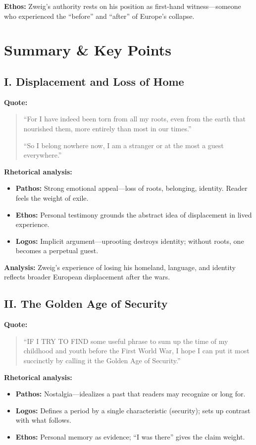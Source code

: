 \documentclass[11pt,a4paper]{article}
\begin{document}
\textbf{Ethos:} Zweig's authority rests on his position as first-hand witness---someone who experienced the ``before'' and ``after'' of Europe's collapse.

\section*{Summary \& Key Points}

\subsection*{I. Displacement and Loss of Home}

\textbf{Quote:}
\begin{quote}
``For I have indeed been torn from all my roots, even from the earth that nourished them, more entirely than most in our times.''

``So I belong nowhere now, I am a stranger or at the most a guest everywhere.''
\end{quote}

\textbf{Rhetorical analysis:}
\begin{itemize}
\item \textbf{Pathos:} Strong emotional appeal---loss of roots, belonging, identity. Reader feels the weight of exile.
\item \textbf{Ethos:} Personal testimony grounds the abstract idea of displacement in lived experience.
\item \textbf{Logos:} Implicit argument---uprooting destroys identity; without roots, one becomes a perpetual guest.
\end{itemize}

\textbf{Analysis:} Zweig's experience of losing his homeland, language, and identity reflects broader European displacement after the wars.

\subsection*{II. The Golden Age of Security}

\textbf{Quote:}
\begin{quote}
``IF I TRY TO FIND some useful phrase to sum up the time of my childhood and youth before the First World War, I hope I can put it most succinctly by calling it the Golden Age of Security.''
\end{quote}

\textbf{Rhetorical analysis:}
\begin{itemize}
\item \textbf{Pathos:} Nostalgia---idealizes a past that readers may recognize or long for.
\item \textbf{Logos:} Defines a period by a single characteristic (security); sets up contrast with what follows.
\item \textbf{Ethos:} Personal memory as evidence; ``I was there'' gives the claim weight.
\end{itemize}
\end{document}
